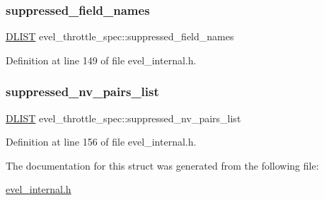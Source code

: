 \hypertarget{structevel__throttle__spec_a31b2a68aa43a1cb9f6e74570f2bcfb1b}{}\label{structevel__throttle__spec_a31b2a68aa43a1cb9f6e74570f2bcfb1b} 
\subsubsection{\texorpdfstring{suppressed\+\_\+field\+\_\+names}{suppressed\_field\_names}}
{\footnotesize\ttfamily \hyperlink{double__list_8h_a45f4a129042d9e1aa4ffd31fe13e4d14}{D\+L\+I\+ST} evel\+\_\+throttle\+\_\+spec\+::suppressed\+\_\+field\+\_\+names}



Definition at line 149 of file evel\+\_\+internal.\+h.

\hypertarget{structevel__throttle__spec_ad99ddec35b92f7b32be0803de60df940}{}\label{structevel__throttle__spec_ad99ddec35b92f7b32be0803de60df940} 
\subsubsection{\texorpdfstring{suppressed\+\_\+nv\+\_\+pairs\+\_\+list}{suppressed\_nv\_pairs\_list}}
{\footnotesize\ttfamily \hyperlink{double__list_8h_a45f4a129042d9e1aa4ffd31fe13e4d14}{D\+L\+I\+ST} evel\+\_\+throttle\+\_\+spec\+::suppressed\+\_\+nv\+\_\+pairs\+\_\+list}



Definition at line 156 of file evel\+\_\+internal.\+h.



The documentation for this struct was generated from the following file\+:\begin{DoxyCompactItemize}
\item 
\hyperlink{evel__internal_8h}{evel\+\_\+internal.\+h}\end{DoxyCompactItemize}
